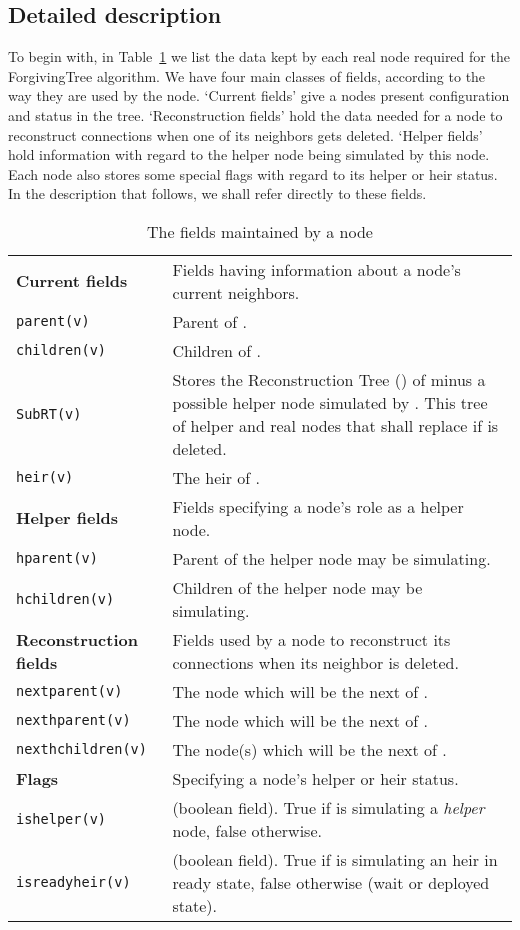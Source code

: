 \documentclass[11pt]{article}
\begin{document}
\subsection{Detailed description} 

To begin with, in Table~\ref{tab: nodedata} we list the data kept by
each real node  required for the ForgivingTree algorithm. We have
four main classes of fields, according to the way they are used by the
node.  `Current fields' give a nodes present configuration and status
in the tree. `Reconstruction fields' hold the data needed for a node
to reconstruct connections when one of its neighbors gets
deleted. `Helper fields' hold information with regard to the helper
node being simulated by this node. Each node also stores some special
flags with regard to its helper or heir status. In the description
that follows, we shall refer directly to these fields.

\begin{table}[!h]
\begin{tabular}{|l|p{4.5in}|}
\hline 
\textbf{Current fields}& Fields having  information about a node's current neighbors.\\ \cline{2-2}
\texttt{parent(v)}& Parent of .\\
  \texttt{children(v)}& Children of .\\
  \texttt{SubRT(v)}& Stores the Reconstruction Tree () of  minus a possible helper node
simulated by .  This tree of helper and real nodes that shall replace  if  is deleted.\\
 \texttt{heir(v)} & The heir of .\\
\hline
\textbf{Helper fields} & Fields specifying a node's role as a helper node.\\ \cline{2-2}
\texttt{hparent(v)}& Parent of the helper node   may be simulating. \\
 \texttt{hchildren(v)}& Children of the helper node  may be simulating.\\
\hline
\textbf{Reconstruction fields}& Fields used by a node to reconstruct its connections when its neighbor is deleted.\\ \cline{2-2}
\texttt{nextparent(v)}& The node which will be the next  of . \\
 \texttt{nexthparent(v)}& The node which will be the next  of . \\
 \texttt{nexthchildren(v)}& The node(s) which will be the next  of .\\
\hline
\textbf{Flags}& Specifying a node's helper or heir status.\\ \cline{2-2}
\texttt{ishelper(v)}& (boolean field). True if  is simulating a \emph{helper} node, false otherwise.\\
\texttt{isreadyheir(v)}&  (boolean field). True if  is simulating an heir in ready state, false otherwise (wait or deployed state). \\
\hline
\end{tabular}
\caption{The fields maintained by a node }
\label{tab: nodedata}
\end{table}
\end{document}

